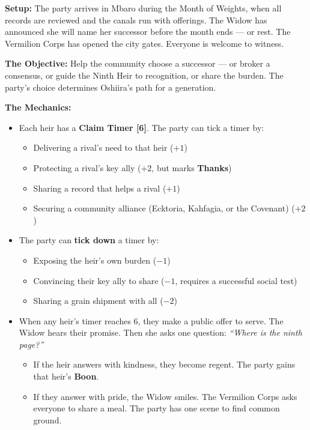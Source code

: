 \begin{tcolorbox}[colback=red!5!white,colframe=red!60!black,title={Mini-Game: The Succession Council},breakable]

\textbf{Setup:} The party arrives in Mbaro during the Month of Weights, when all records are reviewed and the canals run with offerings. The Widow has announced she will name her successor before the month ends --- or rest. The Vermilion Corps has opened the city gates. Everyone is welcome to witness.

\vspace{2mm}
\textbf{The Objective:} Help the community choose a successor --- or broker a consensus, or guide the Ninth Heir to recognition, or share the burden. The party's choice determines Oshiira's path for a generation.

\vspace{2mm}
\textbf{The Mechanics:}
\begin{itemize}
\item Each heir has a \textbf{Claim Timer [6]}. The party can tick a timer by:
  \begin{itemize}
    \item Delivering a rival's need to that heir ($+1$)
    \item Protecting a rival's key ally ($+2$, but marks \textbf{Thanks})
    \item Sharing a record that helps a rival ($+1$)
    \item Securing a community alliance (Ecktoria, Kahfagia, or the Covenant) ($+2$)
  \end{itemize}
\item The party can \textbf{tick down} a timer by:
  \begin{itemize}
    \item Exposing the heir's own burden ($-1$)
    \item Convincing their key ally to share ($-1$, requires a successful social test)
    \item Sharing a grain shipment with all ($-2$)
  \end{itemize}
\item When any heir's timer reaches 6, they make a public offer to serve. The Widow hears their promise. Then she asks one question: \textit{``Where is the ninth page?''}
  \begin{itemize}
    \item If the heir answers with kindness, they become regent. The party gains that heir's \textbf{Boon}.
    \item If they answer with pride, the Widow smiles. The Vermilion Corps asks everyone to share a meal. The party has one scene to find common ground.
  \end{itemize}
\end{itemize}


\end{tcolorbox}
